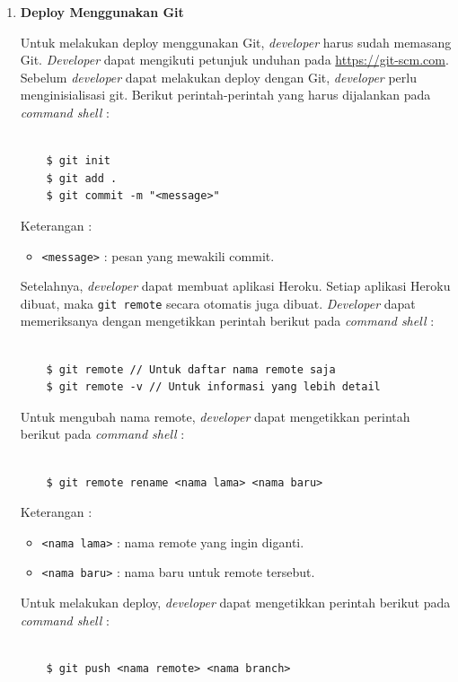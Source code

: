 \documentclass[a4paper,twoside]{article}
\begin{document}
\begin{enumerate}
\begin{enumerate}
\begin{enumerate}
\item \textbf{Deploy Menggunakan Git}

Untuk melakukan deploy menggunakan Git, \textit{developer} harus sudah memasang Git. \textit{Developer} dapat mengikuti petunjuk unduhan pada \url{https://git-scm.com}. Sebelum \textit{developer} dapat melakukan deploy dengan Git, \textit{developer} perlu menginisialisasi git. Berikut perintah-perintah yang harus dijalankan pada \textit{command shell} :
\begin{lstlisting}

	$ git init
	$ git add .
	$ git commit -m "<message>"

\end{lstlisting}
Keterangan :
\begin{itemize}
\item \texttt{<message>} : pesan yang mewakili commit.
\end{itemize}

Setelahnya, \textit{developer} dapat membuat aplikasi Heroku. Setiap aplikasi Heroku dibuat, maka \texttt{git remote} secara otomatis juga dibuat. \textit{Developer} dapat memeriksanya dengan mengetikkan perintah berikut pada \textit{command shell} :
\begin{lstlisting}

	$ git remote // Untuk daftar nama remote saja
	$ git remote -v // Untuk informasi yang lebih detail

\end{lstlisting}

Untuk mengubah nama remote, \textit{developer} dapat mengetikkan perintah berikut pada \textit{command shell} :
\begin{lstlisting}

	$ git remote rename <nama lama> <nama baru>

\end{lstlisting}
Keterangan :
\begin{itemize}
\item \texttt{<nama lama>} : nama remote yang ingin diganti.
\item \texttt{<nama baru>} : nama baru untuk remote tersebut.
\end{itemize}

Untuk melakukan deploy, \textit{developer} dapat mengetikkan perintah berikut pada \textit{command shell} :
\begin{lstlisting}

	$ git push <nama remote> <nama branch>


\end{lstlisting}
\end{enumerate}
\end{enumerate}
\end{enumerate}
\end{document}
